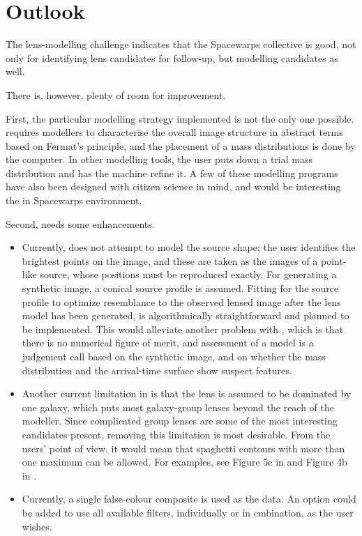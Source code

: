\section{Outlook} \label{sec:todo}

The lens-modelling challenge indicates that the Spacewarps collective
is good, not only for identifying lens candidates for follow-up, but
modelling candidates as well.

There is, however, plenty of room for improvement.

First, the particular modelling strategy implemented is not the only
one possible.  \spl requires modellers to characterise the overall
image structure in abstract terms based on Fermat's principle, and the
placement of a mass distributions is done by the computer.  In other
modelling tools, the user puts down a trial mass distribution and has
the machine refine it.  A few of these modelling programs have also
been designed with citizen science in mind, and would be interesting
the in Spacewarps environment.

Second, \spl needs some enhancements.

\begin{itemize}
\item Currently, \spl does not attempt to model the source shape; the
  user identifies the brightest points on the image, and these are
  taken as the images of a point-like source, whose positions must be
  reproduced exactly.  For generating a synthetic image, a conical
  source profile is assumed.  Fitting for the source profile to
  optimize resemblance to the observed lensed image after the lens
  model has been generated, is algorithmically straightforward and
  planned to be implemented.  This would alleviate another problem
  with \spl, which is that there is no numerical figure of merit, and
  assessment of a model is a judgement call based on the synthetic
  image, and on whether the mass distribution and the arrival-time
  surface show suspect features.
\item Another current limitation in \spl is that the lens is assumed
  to be dominated by one galaxy, which puts most galaxy-group lenses
  beyond the reach of the modeller.  Since complicated group lenses
  are some of the most interesting candidates present, removing this
  limitation is most desirable.  From the users' point of view, it
  would mean that spaghetti contours with more than one maximum can be
  allowed.  For examples, see Figure 5c in \citep{2001ApJ...557..594R}
  and Figure 4b in \cite{2003ApJ...590...39K}.
\item Currently, a single false-colour composite is used as the data.
  An option could be added to use all available filters, individually
  or in cmbination, as the user wishes.
\end{itemize}

